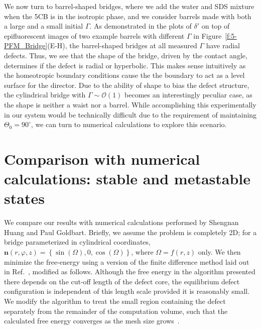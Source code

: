 We now turn to barrel-shaped bridges, where we add the water and SDS mixture when the 5CB is in the isotropic phase, and we consider barrels made with both a large and a small initial $\Gamma$.
As demonstrated in the plots of $\delta'$ on top of epifluorescent images of two example barrels with different $\Gamma$ in Figure~\ref{f:5-PFM_Bridge}(E-H), the barrel-shaped bridges at all measured $\Gamma$ have radial defects.
Thus, we see that the shape of the bridge, driven by the contact angle, determines if the defect is radial or hyperbolic.
This makes sense intuitively as the homeotropic boundary conditions cause the the boundary to act as a level surface for the director.
Due to the ability of shape to bias the defect structure, the cylindrical bridge with $\Gamma \sim \mathcal{O}\left (1 \right )$ becomes an interestingly peculiar case, as the shape is neither a waist nor a barrel.
While accomplishing this experimentally in our system would be technically difficult due to the requirement of maintaining $\Theta_0 = 90^{\circ}$, we can turn to numerical calculations to explore this scenario.




\section{Comparison with numerical calculations: stable and metastable states}
We compare our results with numerical calculations performed by Shengnan Huang and Paul Goldbart.
Briefly, we assume the problem is completely 2D; for a bridge parameterized in cylindrical coordinates, $\mathbf{n}(r,\varphi,z) = \left \{ \sin(\Omega), 0, \cos(\Omega)   \right \}$, where $\Omega = f(r,z)$ only.
We then minimize the free-energy using a version of the finite difference method laid out in Ref.~\cite{RN144}, modified as follows.
Although the free energy in the algorithm presented there depends on the cut-off length of the defect core, the equilibrium defect configuration is independent of this length scale provided it is reasonably small.
We modify the algorithm to treat the small region containing the defect separately from the remainder of the computation volume, such that the calculated free energy converges as the mesh size grows~\cite{RN199,RN200,RN201}.

